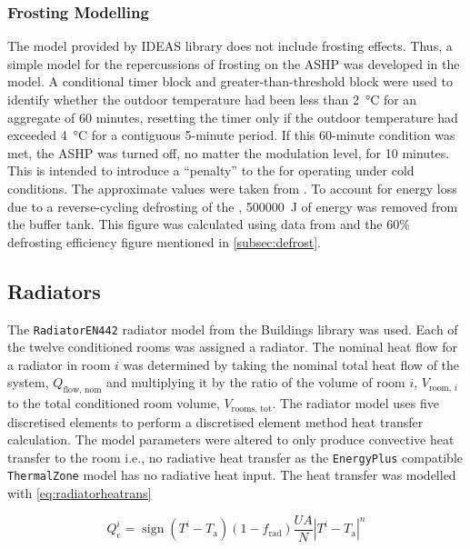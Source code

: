 \subsubsection{Frosting Modelling} \label{subsubsec:frostingmod}
The model provided by IDEAS library does not include frosting effects. Thus, a simple model for the repercussions of frosting on the \ac{ASHP} was developed in the \modelica model. A conditional timer block and greater-than-threshold block were used to identify whether the outdoor temperature had been less than \qty{2}{\celsius} for an aggregate of 60 minutes, resetting the timer only if the outdoor temperature had exceeded \qty{4}{\celsius} for a contiguous 5-minute period. If this 60-minute condition was met, the \ac{ASHP} was turned off, no matter the modulation level, for 10 minutes. This is intended to introduce a ``penalty'' to the \HP for operating under cold conditions. The approximate values were taken from \citeauthor{sandstrom_frosting_2021} \cite{sandstrom_frosting_2021}. To account for energy loss due to a reverse-cycling defrosting of the \HP, \qty{500000}{\joule} of energy was removed from the buffer tank. This figure was calculated using data from \citeauthor{sandstrom_frosting_2021} \cite{sandstrom_frosting_2021} and the 60\% defrosting efficiency figure mentioned in \cref{subsec:defrost}. 

\subsection{Radiators} \label{subsec:rad}
The \texttt{RadiatorEN442} radiator model from the Buildings library \cite{wetter_modelica_2014} was used. Each of the twelve conditioned rooms was assigned a radiator. The nominal heat flow for a radiator in room $i$ was determined by taking the nominal total heat flow of the system, $Q_\text{flow, nom}$ and multiplying it by the ratio of the volume of room $i$, $V_{\text{room, }i}$ to the total conditioned room volume, $V_\text{rooms, tot}$. The radiator model uses five discretised elements to perform a discretised element method heat transfer calculation. The model parameters were altered to only produce convective heat transfer to the room i.e., no radiative heat transfer as the \texttt{EnergyPlus} compatible \texttt{ThermalZone} model has no radiative heat input. The heat transfer was modelled with \cref{eq:radiatorheatrans} 


\begin{equation}
    Q_\text{c}^i=\operatorname{sign}(T^i-T_\text{a})(1-f_\text{rad})\frac{UA}{N}|T^i-T_\text{a}|^n\label{eq:radiatorheatrans}
\end{equation}

